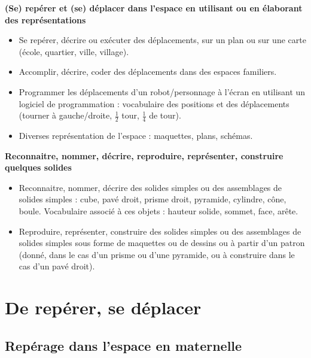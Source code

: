 \begin{prerequis}
{\small
{\bf (Se) repérer et (se) déplacer dans l’espace en utilisant ou en élaborant des représentations}
   \begin{itemize}
      \item Se repérer, décrire ou exécuter des déplacements, sur un plan ou sur une carte (école, quartier, ville, village).
      \item Accomplir, décrire, coder des déplacements dans des espaces familiers.
      \item Programmer les déplacements d’un robot/personnage à l'écran en utilisant un logiciel de programmation : vocabulaire des positions et des déplacements (tourner à gauche/droite, $\frac12$ tour, $\frac14$ de tour).
      \item Diverses représentation de l’espace : maquettes, plans, schémas.
   \end{itemize}
{\bf Reconnaitre, nommer, décrire, reproduire, représenter, construire quelques solides}
   \begin{itemize}
      \item Reconnaitre, nommer, décrire des solides simples ou des assemblages de solides simples : cube, pavé droit, prisme droit, pyramide, cylindre, cône, boule. Vocabulaire associé à ces objets : hauteur solide, sommet, face, arête.
      \item Reproduire, représenter, construire des solides simples ou des assemblages de solides simples sous forme de maquettes ou de dessins ou à partir d’un patron (donné, dans le cas d’un prisme ou d’une pyramide, ou à construire dans le cas d’un pavé droit).
   \end{itemize}}
\end{prerequis}


\reperes


\section{De repérer, se déplacer}

\subsection{Repérage dans l'espace en maternelle}

